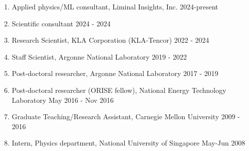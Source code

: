 \begin{enumerate}
    \item Applied physics/ML consultant, Liminal Insights, Inc. \hfill 2024-present
    \item Scientific consultant \hfill 2024 - 2024
    \item Research Scientist, KLA Corporation (KLA-Tencor) \hfill 2022 - 2024
    \item Staff Scientist, Argonne National Laboratory \hfill 2019 - 2022
    \item Post-doctoral researcher, Argonne National Laboratory \hfill 2017 - 2019
    \item Post-doctoral researcher (ORISE fellow), National Energy Technology Laboratory  \hfill May 2016 - Nov 2016
    \item Graduate Teaching/Research Assistant, Carnegie Mellon University \hfill 2009 - 2016
    \item Intern, Physics department, National University of Singapore \hfill May-Jun 2008 
\end{enumerate}